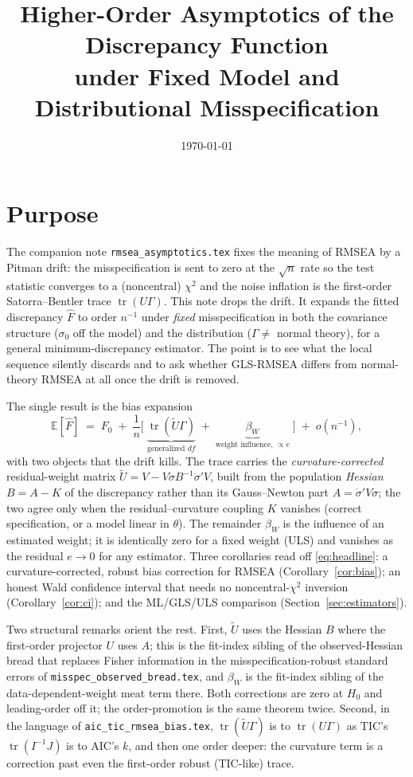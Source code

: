 \documentclass[11pt]{article}
\title{Higher-Order Asymptotics of the Discrepancy Function\\
under Fixed Model and Distributional Misspecification}
\author{}
\date{\today}
\newcommand{\E}{\mathbb{E}}
\newcommand{\tr}{\operatorname{tr}}
\theoremstyle{plain}
\theoremstyle{remark}
\begin{document}
\maketitle

\section*{Purpose}

The companion note \texttt{rmsea\_asymptotics.tex} fixes the meaning of RMSEA by
a Pitman drift: the misspecification is sent to zero at the $\sqrt n$ rate so the
test statistic converges to a (noncentral) $\chi^2$ and the noise inflation is
the first-order Satorra--Bentler trace $\tr(U\Gamma)$. This note drops the drift.
It expands the fitted discrepancy $\hat F$ to order $n^{-1}$ under
\emph{fixed} misspecification in both the covariance structure ($\sigma_0$ off
the model) and the distribution ($\Gamma\ne$ normal theory), for a general
minimum-discrepancy estimator. The point is to see what the local sequence
silently discards and to ask whether GLS-RMSEA differs from normal-theory RMSEA
at all once the drift is removed.

The single result is the bias expansion
\begin{equation}\label{eq:headline}
  \E[\hat F] \;=\; F_0 \;+\; \frac1n\Big[\;\underbrace{\tr(\tilde U\Gamma)}_{\text{generalized }df}
  \;+\; \underbrace{\beta_W}_{\text{weight influence, }\propto e}\;\Big] \;+\; o(n^{-1}),
\end{equation}
with two objects that the drift kills. The trace carries the
\emph{curvature-corrected} residual-weight matrix
$\tilde U = V - V\dot\sigma B^{-1}\dot\sigma'V$, built from the population
\emph{Hessian} $B=A-K$ of the discrepancy rather than its Gauss--Newton part
$A=\dot\sigma'V\dot\sigma$; the two agree only when the residual--curvature
coupling $K$ vanishes (correct specification, or a model linear in $\theta$). The
remainder $\beta_W$ is the influence of an estimated weight; it is identically
zero for a fixed weight (ULS) and vanishes as the residual $e\to0$ for any
estimator. Three corollaries read off \eqref{eq:headline}: a
curvature-corrected, robust bias correction for RMSEA
(Corollary~\ref{cor:bias}); an honest Wald confidence interval that needs no
noncentral-$\chi^2$ inversion (Corollary~\ref{cor:ci}); and the ML/GLS/ULS
comparison (Section~\ref{sec:estimators}).

Two structural remarks orient the rest. First, $\tilde U$ uses the Hessian $B$
where the first-order projector $U$ uses $A$; this is the fit-index sibling of
the observed-Hessian bread that replaces Fisher information in the
misspecification-robust standard errors of \texttt{misspec\_observed\_bread.tex},
and $\beta_W$ is the fit-index sibling of the data-dependent-weight meat term
there. Both corrections are zero at $H_0$ and leading-order off it; the
order-promotion is the same theorem twice. Second, in the language of
\texttt{aic\_tic\_rmsea\_bias.tex}, $\tr(\tilde U\Gamma)$ is to $\tr(U\Gamma)$ as
TIC's $\tr(I^{-1}J)$ is to AIC's $k$, and then one order deeper: the curvature
term is a correction past even the first-order robust (TIC-like) trace.
\end{document}
